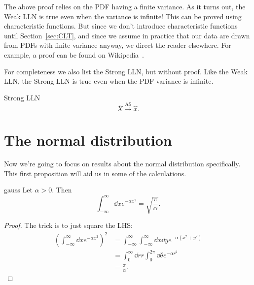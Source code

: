 The above proof relies on the PDF having a finite
variance. As it turns out, the Weak LLN is true
even when the variance is infinite! This can be proved
using characteristic functions. But since we don't introduce characteristic
functions until Section~\ref{sec:CLT}, and since we assume in practice
that our data are drawn from PDFs with finite variance anyway,
we direct the reader elsewhere. For example, a proof can be
found on Wikipedia~\cite{Wiki_LLN}.

For completeness we also list the Strong LLN, but without proof. 
Like the Weak LLN, the Strong LLN is true even when the PDF variance
is infinite.

\begin{theorem}{Strong LLN}{}
  $$
    \bar{X}\xrightarrow{\text{AS}}\hat{x}.
  $$
\end{theorem}

\section{The normal distribution}
Now we're going to focus on results about the normal distribution specifically.
This first proposition will aid us in some of the calculations.

\begin{proposition}{}{gauss}
  Let $\alpha>0$. Then
  \begin{equation*}
    \int_{-\infty}^\infty\dd{x}e^{-\alpha x^2}=\sqrt{\frac{\pi}{\alpha}}.
  \end{equation*}
  \begin{proof}
    The trick is to just square the LHS:
    \begin{equation*}\begin{aligned}
      \left(\int_{-\infty}^\infty\dd{x}e^{-\alpha x^2}\right)^2
      &=\int_{-\infty}^\infty\int_{-\infty}^\infty\dd{x}\dd{y}
        e^{-\alpha(x^2+y^2)}\\
      &=\int_0^\infty \dd{r}r\int_0^{2\pi}\dd{\theta}e^{-\alpha r^2}\\
      &=\frac{\pi}{\alpha}.
    \end{aligned}\end{equation*}
  \end{proof}
\end{proposition}

